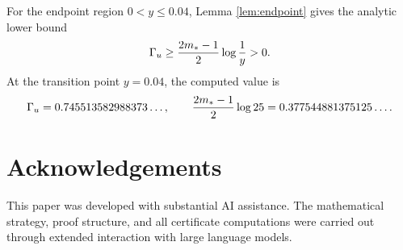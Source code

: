 \begin{proposition}\label{prop:A9}
For the endpoint region \(0<y\le0.04\), Lemma \ref{lem:endpoint} gives the
analytic lower bound
\begin{equation}\label{eq:A9_endpoint}
  \Gamma_u\ge\frac{2m_*-1}{2}\log\frac1y>0.
\end{equation}
At the transition point \(y=0.04\), the computed value is
\begin{equation}\label{eq:endpoint_numeric_app}
  \Gamma_u=0.745513582988373\ldots,
  \qquad
  \frac{2m_*-1}{2}\log25=0.377544881375125\ldots .
\end{equation}
\end{proposition}


\section*{Acknowledgements}
This paper was developed with substantial AI assistance.
The mathematical strategy, proof structure, and all
certificate computations were carried out through
extended interaction with large language models.

